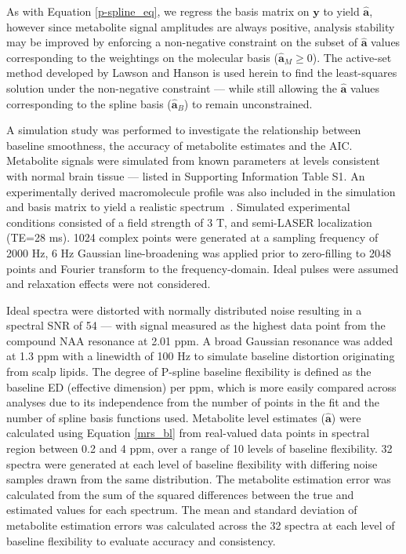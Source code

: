 \documentclass[num-refs]{wiley-article}
\begin{document}
As with Equation \ref{p-spline_eq}, we regress the basis matrix on $\mathbf{y}$ to yield $\hat{\mathbf{a}}$, however since metabolite signal amplitudes are always positive, analysis stability may be improved by enforcing a non-negative constraint on the subset of $\hat{\mathbf{a}}$ values corresponding to the weightings on the molecular basis ($\hat{\mathbf{a}}_{M} \geq 0$). The active-set method developed by Lawson and Hanson \cite{Lawson1995} is used herein to find the least-squares solution under the non-negative constraint --- while still allowing the $\hat{\mathbf{a}}$ values corresponding to the spline basis ($\hat{\mathbf{a}}_{B}$) to remain unconstrained.

A simulation study was performed to investigate the relationship between baseline smoothness, the accuracy of metabolite estimates and the AIC. Metabolite signals were simulated from known parameters \cite{Govind2015} at levels consistent with normal brain tissue \cite{deGraaf2018} --- listed in Supporting Information Table S1. An experimentally derived macromolecule profile was also included in the simulation and basis matrix to yield a realistic spectrum~\cite{Birch2017}. Simulated experimental conditions consisted of a field strength of 3 T, and semi-LASER localization (TE=28 ms). 1024 complex points were generated at a sampling frequency of 2000 Hz, 6 Hz Gaussian line-broadening was applied prior to zero-filling to 2048 points and Fourier transform to the frequency-domain. Ideal pulses were assumed and relaxation effects were not considered.

Ideal spectra were distorted with normally distributed noise resulting in a spectral SNR of 54 --- with signal measured as the highest data point from the compound NAA resonance at 2.01 ppm. A broad Gaussian resonance was added at 1.3 ppm with a linewidth of 100 Hz to simulate baseline distortion originating from scalp lipids. The degree of P-spline baseline flexibility is defined as the baseline ED (effective dimension) per ppm, which is more easily compared across analyses due to its independence from the number of points in the fit and the number of spline basis functions used. Metabolite level estimates ($\hat{\mathbf{a}}$) were calculated using Equation \ref{mrs_bl} from real-valued data points in spectral region between 0.2 and 4 ppm, over a range of 10 levels of baseline flexibility. 32 spectra were generated at each level of baseline flexibility with differing noise samples drawn from the same distribution. The metabolite estimation error was calculated from the sum of the squared differences between the true and estimated values for each spectrum. The mean and standard deviation of metabolite estimation errors was calculated across the 32 spectra at each level of baseline flexibility to evaluate accuracy and consistency.
\end{document}
